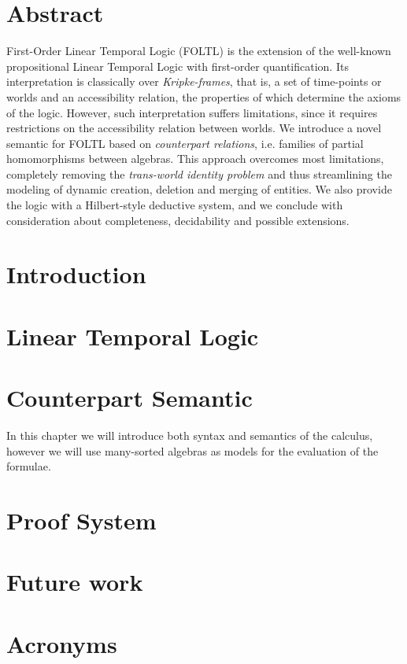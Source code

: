 \documentclass[a4paper,11pt]{report}
\begin{document}
\chapter*{Abstract}

First-Order Linear Temporal Logic (FOLTL) is the extension of the well-known propositional Linear Temporal Logic with
first-order quantification. Its interpretation is classically over \emph{Kripke-frames}, that is, a set of time-points
or worlds and an accessibility relation, the properties of which determine the axioms of the logic.  However, such
interpretation suffers limitations, since it requires restrictions on the accessibility relation between worlds. We
introduce a novel semantic for FOLTL based on \emph{counterpart relations}, i.e. families of partial homomorphisms
between algebras. This approach overcomes most limitations, completely removing the \emph{trans-world identity problem}
and thus streamlining the modeling of dynamic creation, deletion and merging of entities. We also provide the logic with
a Hilbert-style deductive system, and we conclude with consideration about completeness, decidability and possible
extensions.

\chapter{Introduction}\label{chap:intro}


\chapter{Linear Temporal Logic}\label{chap:ltl}


\chapter{Counterpart Semantic}\label{chap:counterpart}
In this chapter we will introduce both syntax and semantics of the calculus, however we will use many-sorted algebras as
models for the evaluation of the formulae.





\chapter{Proof System}\label{chap:system}


\chapter{Future work}\label{chap:future}


\chapter*{Acronyms}
\begin{acronym}
\end{acronym}

\printbibliography
\end{document}
